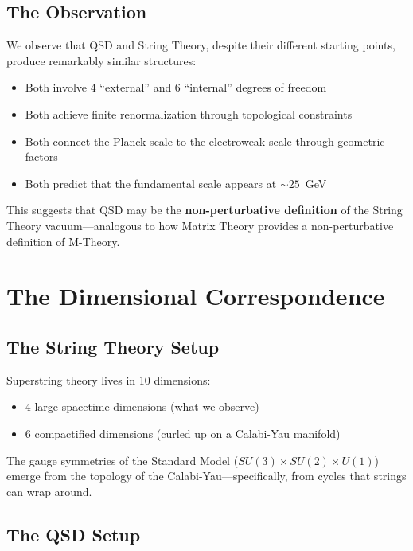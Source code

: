 \documentclass[11pt,a4paper]{article}
\theoremstyle{definition}
\begin{document}
\subsection{The Observation}

We observe that QSD and String Theory, despite their different starting points, produce remarkably similar structures:
\begin{itemize}[nosep]
    \item Both involve 4 ``external'' and 6 ``internal'' degrees of freedom
    \item Both achieve finite renormalization through topological constraints
    \item Both connect the Planck scale to the electroweak scale through geometric factors
    \item Both predict that the fundamental scale appears at $\sim 25$~GeV
\end{itemize}

This suggests that QSD may be the \textbf{non-perturbative definition} of the String Theory vacuum---analogous to how Matrix Theory provides a non-perturbative definition of M-Theory.

\section{The Dimensional Correspondence}
\label{sec:dimensions}

\subsection{The String Theory Setup}

Superstring theory lives in 10 dimensions:
\begin{itemize}[nosep]
    \item 4 large spacetime dimensions (what we observe)
    \item 6 compactified dimensions (curled up on a Calabi-Yau manifold)
\end{itemize}

The gauge symmetries of the Standard Model ($SU(3) \times SU(2) \times U(1)$) emerge from the topology of the Calabi-Yau---specifically, from cycles that strings can wrap around.

\subsection{The QSD Setup}
\end{document}
